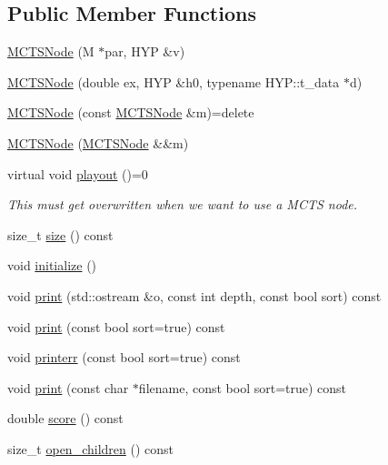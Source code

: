 \subsection*{Public Member Functions}
\begin{DoxyCompactItemize}
\item 
\hyperlink{class_m_c_t_s_node_a94e679ddbb9f4eeaaa45b6214889f47c}{M\+C\+T\+S\+Node} (M $\ast$par, H\+YP \&v)
\item 
\hyperlink{class_m_c_t_s_node_a944daa7d3d710b6e8000dc8dc076c674}{M\+C\+T\+S\+Node} (double ex, H\+YP \&h0, typename H\+Y\+P\+::t\+\_\+data $\ast$d)
\item 
\hyperlink{class_m_c_t_s_node_aaa84f65b021fd06667185b4b9c5931e6}{M\+C\+T\+S\+Node} (const \hyperlink{class_m_c_t_s_node}{M\+C\+T\+S\+Node} \&m)=delete
\item 
\hyperlink{class_m_c_t_s_node_acf0c6f2110d0acb7dd1a281d3138056d}{M\+C\+T\+S\+Node} (\hyperlink{class_m_c_t_s_node}{M\+C\+T\+S\+Node} \&\&m)
\item 
virtual void \hyperlink{class_m_c_t_s_node_a9b98535db702f0e9ee221615bd658214}{playout} ()=0
\begin{DoxyCompactList}\small\item\em This must get overwritten when we want to use a M\+C\+TS node. \end{DoxyCompactList}\item 
size\+\_\+t \hyperlink{class_m_c_t_s_node_a7996e64e69b1fc705c4e21b4a6e41c39}{size} () const
\item 
void \hyperlink{class_m_c_t_s_node_aadbe8d42f6761eb3e4f28fb9157a873d}{initialize} ()
\item 
void \hyperlink{class_m_c_t_s_node_ab4d95f5a7a753b39d30771b4e385a934}{print} (std\+::ostream \&o, const int depth, const bool sort) const
\item 
void \hyperlink{class_m_c_t_s_node_ad82ca09e761b18033a2418c3f564151f}{print} (const bool sort=true) const
\item 
void \hyperlink{class_m_c_t_s_node_a258317ddcd07a57a34a9a2eeec6f10b9}{printerr} (const bool sort=true) const
\item 
void \hyperlink{class_m_c_t_s_node_ae0d17485c455b8d7e4fa9ee1a179d631}{print} (const char $\ast$filename, const bool sort=true) const
\item 
double \hyperlink{class_m_c_t_s_node_a1a051c22b8821704a10bf33dbd426c4d}{score} () const
\item 
size\+\_\+t \hyperlink{class_m_c_t_s_node_a40ca22fadfb24bed0ccbd15d3958c674}{open\+\_\+children} () const

\end{DoxyCompactItemize}
